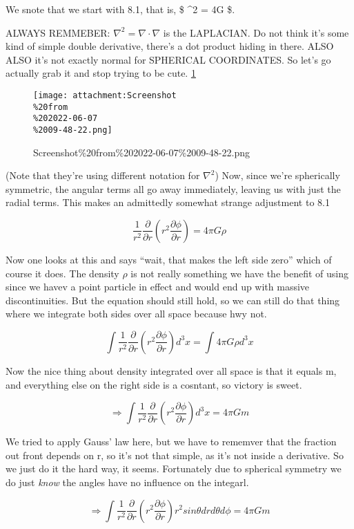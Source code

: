 \documentclass[landscape,letterpaper,10pt,english]{article}
\begin{document}
We snote that we start with 8.1, that is, \$ \nabla\^{}2 \phi = 4\pi G
\rho \$.

ALWAYS REMMEBER: \(\nabla^2 = \nabla \cdot \nabla\) is the LAPLACIAN. Do
not think it's some kind of simple double derivative, there's a dot
product hiding in there. ALSO ALSO it's not exactly normal for SPHERICAL
COORDINATES. So let's go actually grab it and stop trying to be cute.
\hyperref[1]{1}

\begin{figure}
\centering
\texttt{[image: attachment:Screenshot\\\%20from\\\%202022-06-07\\\%2009-48-22.png]}
\caption{Screenshot\%20from\%202022-06-07\%2009-48-22.png}
\end{figure}

    (Note that they're using different notation for \(\nabla^2\)) Now, since
we're spherically symmetric, the angular terms all go away immediately,
leaving us with just the radial terms. This makes an admittedly somewhat
strange adjustment to 8.1

\[ \frac{1}{r^2} \frac{\partial}{\partial r} (r^2 \frac{\partial \phi}{\partial r}) = 4\pi G \rho \]

    Now one looks at this and says ``wait, that makes the left side zero''
which of course it does. The density \(\rho\) is not really something we
have the benefit of using since we havev a point particle in effect and
would end up with massive discontinuities. But the equation should still
hold, so we can still do that thing where we integrate both sides over
all space because hwy not.

\[ \int \frac{1}{r^2} \frac{\partial}{\partial r} (r^2 \frac{\partial \phi}{\partial r}) d^3x = \int 4\pi G \rho d^3x \]

    Now the nice thing about density integrated over all space is that it
equals m, and everything else on the right side is a cosntant, so
victory is sweet.

\[ \Rightarrow \int \frac{1}{r^2} \frac{\partial}{\partial r} (r^2 \frac{\partial \phi}{\partial r}) d^3x = 4\pi G m \]

We tried to apply Gauss' law here, but we have to rememver that the
fraction out front depends on r, so it's not that simple, as it's not
inside a derivative. So we just do it the hard way, it seems.
Fortunately due to spherical symmetry we do just \emph{know} the angles
have no influence on the integarl.

\[ \Rightarrow \int \frac{1}{r^2} \frac{\partial}{\partial r} (r^2 \frac{\partial \phi}{\partial r}) r^2sin\theta drd\theta d\phi = 4\pi G m \]
\end{document}
